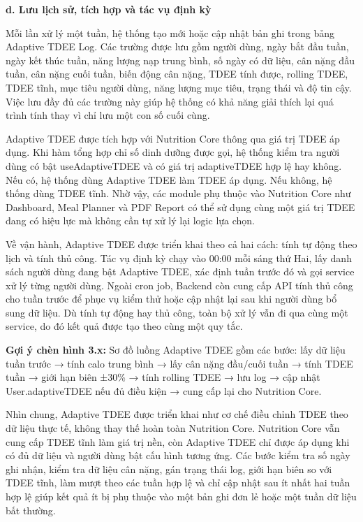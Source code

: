 \documentclass[12pt, a4paper]{report}
\begin{document}
\textbf{d. Lưu lịch sử, tích hợp và tác vụ định kỳ}

Mỗi lần xử lý một tuần, hệ thống tạo mới hoặc cập nhật bản ghi trong bảng Adaptive TDEE Log. Các trường được lưu gồm người dùng, ngày bắt đầu tuần, ngày kết thúc tuần, năng lượng nạp trung bình, số ngày có dữ liệu, cân nặng đầu tuần, cân nặng cuối tuần, biến động cân nặng, TDEE tính được, rolling TDEE, TDEE tĩnh, mục tiêu người dùng, năng lượng mục tiêu, trạng thái và độ tin cậy. Việc lưu đầy đủ các trường này giúp hệ thống có khả năng giải thích lại quá trình tính thay vì chỉ lưu một con số cuối cùng.

Adaptive TDEE được tích hợp với Nutrition Core thông qua giá trị TDEE áp dụng. Khi hàm tổng hợp chỉ số dinh dưỡng được gọi, hệ thống kiểm tra người dùng có bật useAdaptiveTDEE và có giá trị adaptiveTDEE hợp lệ hay không. Nếu có, hệ thống dùng Adaptive TDEE làm TDEE áp dụng. Nếu không, hệ thống dùng TDEE tĩnh. Nhờ vậy, các module phụ thuộc vào Nutrition Core như Dashboard, Meal Planner và PDF Report có thể sử dụng cùng một giá trị TDEE đang có hiệu lực mà không cần tự xử lý lại logic lựa chọn.

Về vận hành, Adaptive TDEE được triển khai theo cả hai cách: tính tự động theo lịch và tính thủ công. Tác vụ định kỳ chạy vào 00:00 mỗi sáng thứ Hai, lấy danh sách người dùng đang bật Adaptive TDEE, xác định tuần trước đó và gọi service xử lý từng người dùng. Ngoài cron job, Backend còn cung cấp API tính thủ công cho tuần trước để phục vụ kiểm thử hoặc cập nhật lại sau khi người dùng bổ sung dữ liệu. Dù tính tự động hay thủ công, toàn bộ xử lý vẫn đi qua cùng một service, do đó kết quả được tạo theo cùng một quy tắc.

\textbf{Gợi ý chèn hình 3.x:} Sơ đồ luồng Adaptive TDEE gồm các bước: lấy dữ liệu tuần trước → tính calo trung bình → lấy cân nặng đầu/cuối tuần → tính TDEE tuần → giới hạn biên ±30\% → tính rolling TDEE → lưu log → cập nhật User.adaptiveTDEE nếu đủ điều kiện → cung cấp lại cho Nutrition Core.

Nhìn chung, Adaptive TDEE được triển khai như cơ chế điều chỉnh TDEE theo dữ liệu thực tế, không thay thế hoàn toàn Nutrition Core. Nutrition Core vẫn cung cấp TDEE tĩnh làm giá trị nền, còn Adaptive TDEE chỉ được áp dụng khi có đủ dữ liệu và người dùng bật cấu hình tương ứng. Các bước kiểm tra số ngày ghi nhận, kiểm tra dữ liệu cân nặng, gán trạng thái log, giới hạn biên so với TDEE tĩnh, làm mượt theo các tuần hợp lệ và chỉ cập nhật sau ít nhất hai tuần hợp lệ giúp kết quả ít bị phụ thuộc vào một bản ghi đơn lẻ hoặc một tuần dữ liệu bất thường.
\end{document}
